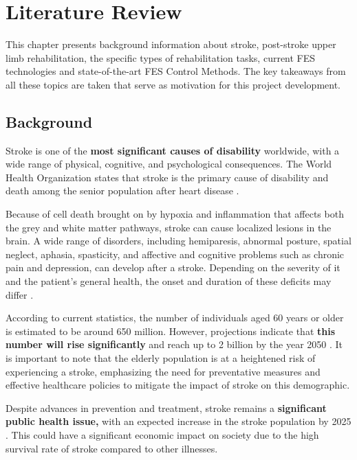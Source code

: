 \chapter{Literature Review}

This chapter presents background information about stroke, post-stroke upper limb rehabilitation, the specific types of rehabilitation tasks, current FES technologies and state-of-the-art FES Control Methods. The key takeaways from all these topics are taken that serve as motivation for this project development. 

\section{Background}

Stroke is one of the \textbf{most significant causes of disability }worldwide, with a wide range of physical, cognitive, and psychological consequences. The World Health Organization states that stroke is the primary cause of disability and death among the senior population after heart disease \cite{WHO}.

Because of cell death brought on by hypoxia and inflammation that affects both the grey and white matter pathways, stroke can cause localized lesions in the brain. A wide range of disorders, including hemiparesis, abnormal posture, spatial neglect, aphasia, spasticity, and affective and cognitive problems such as chronic pain and depression, can develop after a stroke. Depending on the severity of it and the patient's general health, the onset and duration of these deficits may differ \cite{Corbetta2015}.

 According to current statistics, the number of individuals aged 60 years or older is estimated to be around 650 million. However, projections indicate that \textbf{this number will rise significantly }and reach up to 2 billion by the year 2050 \cite{Cardiovascular}. It is important to note that the elderly population is at a heightened risk of experiencing a stroke, emphasizing the need for preventative measures and effective healthcare policies to mitigate the impact of stroke on this demographic.

Despite advances in prevention and treatment, stroke remains a \textbf{significant public health issue,} with an expected increase in the stroke population by 2025 \cite{Anwer2022}. This could have a significant economic impact on society due to the high survival rate of stroke compared to other illnesses.

